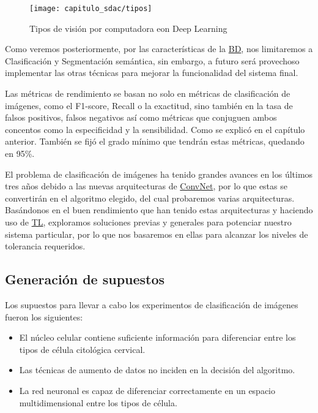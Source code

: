 \begin{figure}[H]
  \centering
  \texttt{[image: capitulo\_sdac/tipos]}
  \caption{Tipos de visión por computadora eon Deep Learning}\label{fig:tipos}
\end{figure}


Como veremos posteriormente, por las características de la \hyperlink{abbr}{BD},
nos limitaremos a Clasificación y Segmentación semántica, sin embargo, a futuro
será provechoso implementar las otras técnicas para mejorar la funcionalidad del
sistema final.

Las métricas de rendimiento se basan no solo en métricas de clasificación de
imágenes, como el F1-score, Recall o la exactitud, sino también en la tasa de
falsos positivos, falsos negativos así como métricas que conjuguen ambos
concentos como la especificidad y la sensibilidad. Como se explicó en el
capítulo anterior. También se fijó el grado mínimo que tendrán estas métricas,
quedando en 95\%.

El problema de clasificación de imágenes ha tenido grandes avances en los
últimos tres años debido a las nuevas arquitecturas de
\hyperlink{abbr}{ConvNet}, por lo que estas se convertirán en el algoritmo
elegido, del cual probaremos varias arquitecturas. Basándonos en el buen
rendimiento que han tenido estas arquitecturas y haciendo uso de
\hyperlink{abbr}{TL}, exploramos soluciones previas y generales para potenciar
nuestro sistema particular, por lo que nos basaremos en ellas para alcanzar los
niveles de tolerancia requeridos.

\subsection{Generación de supuestos}

Los supuestos para llevar a cabo los experimentos de clasificación de imágenes
fueron los siguientes:

\begin{itemize}
  \item El núcleo celular contiene suficiente información para diferenciar entre
  los tipos de célula citológica cervical.
  \item Las técnicas de aumento de datos no inciden en la decisión del
  algoritmo.
  \item La red neuronal es capaz de diferenciar correctamente en un espacio
  multidimensional entre los tipos de célula.
\end{itemize}

